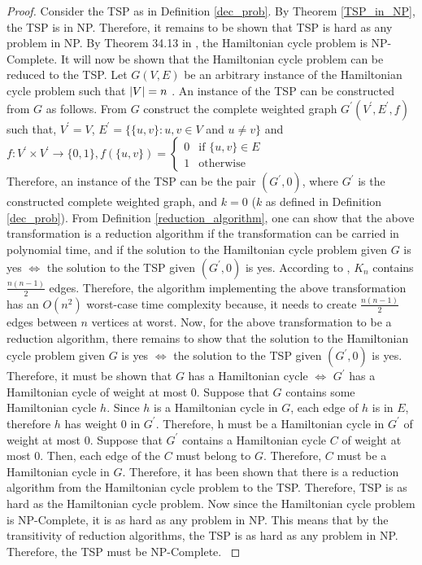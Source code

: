 \documentclass[12pt]{article}
\numberwithin{equation}{subsection}
\numberwithin{table}{subsection}
\numberwithin{algorithm}{subsection}
\begin{document}
\begin{proof}
Consider the TSP as in Definition \ref{dec_prob}. By Theorem \ref{TSP_in_NP}, the TSP is in NP. Therefore, it remains to be shown that TSP is hard as any problem in NP. By Theorem 34.13 in \cite{cormen_leiserson_rivest_stein}, the Hamiltonian cycle problem is NP-Complete. It will now be shown that the Hamiltonian cycle problem can be reduced to the TSP. Let $G(V,E)$ be an arbitrary instance of the Hamiltonian cycle problem such that $\abs{V} = n$ . An instance of the TSP can be constructed from $G$ as follows. From $G$ construct the complete weighted graph $G^\prime(V^\prime,E^\prime,f)$ such that, $V^\prime=V$, $E^\prime=\{\{u, v\} : u, v \in V$ and $u \neq v\}$ and \\
$f\colon V^\prime \times V^\prime \to \{0,1\}, f(\{u, v\}) = \begin{cases} 0& \text{if } \{u, v\} \in E\\ 1              & \text{otherwise} \end{cases}$\\
Therefore, an instance of the TSP can be the pair $(G^\prime,0)$, where $G^\prime$ is the constructed complete weighted graph, and $k =0$ ($k$ as defined in Definition \ref{dec_prob}). From Definition \ref{reduction_algorithm}, one can show that the above transformation is a reduction algorithm if the transformation can be carried in polynomial time, and if the solution to the Hamiltonian cycle problem given $G$ is yes $\iff$ the solution to the TSP given $(G^\prime,0)$ is yes. According to \cite{ray_2013}, $K_n$ contains $\frac{n(n-1)}{2}$ edges. Therefore, the algorithm implementing the above transformation has an $O(n^2)$ worst-case time complexity because, it needs to create $\frac{n(n-1)}{2}$ edges between $n$ vertices at worst. Now, for the above transformation to be a reduction algorithm, there remains to show that the solution to the Hamiltonian cycle problem given $G$ is yes $\iff$ the solution to the TSP given $(G^\prime,0)$ is yes. Therefore, it must be shown that $G$ has a Hamiltonian cycle $\iff$ $G^\prime$ has a Hamiltonian cycle of weight at most 0. Suppose that $G$ contains some Hamiltonian cycle $h$. Since $h$ is a Hamiltonian cycle in $G$, each edge of $h$ is in $E$, therefore $h$ has weight 0 in $G^\prime$. Therefore, h must be a Hamiltonian cycle in $G^\prime$ of weight at most 0. Suppose that $G^\prime$ contains a Hamiltonian cycle $C$ of weight at most 0. Then, each edge of the $C$ must belong to $G$. Therefore, $C$ must be a Hamiltonian cycle in $G$. Therefore, it has been shown that there is a reduction algorithm from the Hamiltonian cycle problem to the TSP. Therefore, TSP is as hard as the Hamiltonian cycle problem. Now since the Hamiltonian cycle problem is NP-Complete, it is as hard as any problem in NP. This means that by the transitivity of reduction algorithms, the TSP is as hard as any problem in NP. Therefore, the TSP must be NP-Complete. \cite{cormen_leiserson_rivest_stein}
\end{proof}
\end{document}
